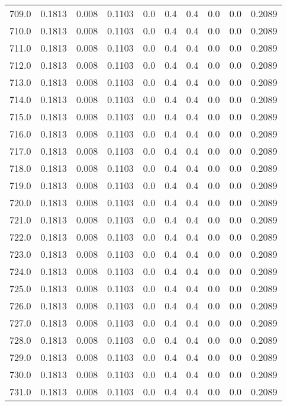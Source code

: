 \begin{longtable}{lrrrrrrrrr}
709.0 & 0.1813 & 0.008 & 0.1103 & 0.0 & 0.4 & 0.4 & 0.0 & 0.0 & 0.2089 \\
710.0 & 0.1813 & 0.008 & 0.1103 & 0.0 & 0.4 & 0.4 & 0.0 & 0.0 & 0.2089 \\
711.0 & 0.1813 & 0.008 & 0.1103 & 0.0 & 0.4 & 0.4 & 0.0 & 0.0 & 0.2089 \\
712.0 & 0.1813 & 0.008 & 0.1103 & 0.0 & 0.4 & 0.4 & 0.0 & 0.0 & 0.2089 \\
713.0 & 0.1813 & 0.008 & 0.1103 & 0.0 & 0.4 & 0.4 & 0.0 & 0.0 & 0.2089 \\
714.0 & 0.1813 & 0.008 & 0.1103 & 0.0 & 0.4 & 0.4 & 0.0 & 0.0 & 0.2089 \\
715.0 & 0.1813 & 0.008 & 0.1103 & 0.0 & 0.4 & 0.4 & 0.0 & 0.0 & 0.2089 \\
716.0 & 0.1813 & 0.008 & 0.1103 & 0.0 & 0.4 & 0.4 & 0.0 & 0.0 & 0.2089 \\
717.0 & 0.1813 & 0.008 & 0.1103 & 0.0 & 0.4 & 0.4 & 0.0 & 0.0 & 0.2089 \\
718.0 & 0.1813 & 0.008 & 0.1103 & 0.0 & 0.4 & 0.4 & 0.0 & 0.0 & 0.2089 \\
719.0 & 0.1813 & 0.008 & 0.1103 & 0.0 & 0.4 & 0.4 & 0.0 & 0.0 & 0.2089 \\
720.0 & 0.1813 & 0.008 & 0.1103 & 0.0 & 0.4 & 0.4 & 0.0 & 0.0 & 0.2089 \\
721.0 & 0.1813 & 0.008 & 0.1103 & 0.0 & 0.4 & 0.4 & 0.0 & 0.0 & 0.2089 \\
722.0 & 0.1813 & 0.008 & 0.1103 & 0.0 & 0.4 & 0.4 & 0.0 & 0.0 & 0.2089 \\
723.0 & 0.1813 & 0.008 & 0.1103 & 0.0 & 0.4 & 0.4 & 0.0 & 0.0 & 0.2089 \\
724.0 & 0.1813 & 0.008 & 0.1103 & 0.0 & 0.4 & 0.4 & 0.0 & 0.0 & 0.2089 \\
725.0 & 0.1813 & 0.008 & 0.1103 & 0.0 & 0.4 & 0.4 & 0.0 & 0.0 & 0.2089 \\
726.0 & 0.1813 & 0.008 & 0.1103 & 0.0 & 0.4 & 0.4 & 0.0 & 0.0 & 0.2089 \\
727.0 & 0.1813 & 0.008 & 0.1103 & 0.0 & 0.4 & 0.4 & 0.0 & 0.0 & 0.2089 \\
728.0 & 0.1813 & 0.008 & 0.1103 & 0.0 & 0.4 & 0.4 & 0.0 & 0.0 & 0.2089 \\
729.0 & 0.1813 & 0.008 & 0.1103 & 0.0 & 0.4 & 0.4 & 0.0 & 0.0 & 0.2089 \\
730.0 & 0.1813 & 0.008 & 0.1103 & 0.0 & 0.4 & 0.4 & 0.0 & 0.0 & 0.2089 \\
731.0 & 0.1813 & 0.008 & 0.1103 & 0.0 & 0.4 & 0.4 & 0.0 & 0.0 & 0.2089 \\

\end{longtable}
